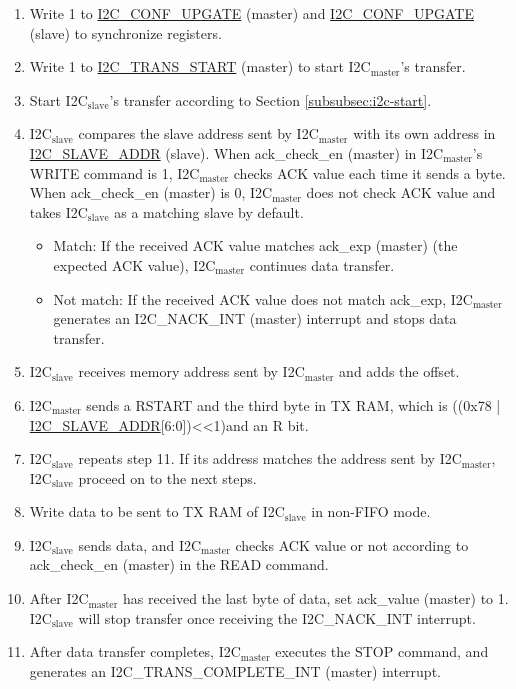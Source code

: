 \documentclass[main\_\_EN.tex]{subfiles}
\begin{document}
\begin{enumerate}
\item Write 1 to \hyperref[fielddesc:I2CCONFUPGATE]{I2C\_CONF\_UPGATE} (master) and \hyperref[fielddesc:I2CCONFUPGATE]{I2C\_CONF\_UPGATE} (slave) to synchronize registers.
\item Write 1 to \hyperref[fielddesc:I2CTRANSSTART]{I2C\_TRANS\_START} (master) to start I2C$_\text{master}$'s transfer.
\item Start I2C$_\text{slave}$'s transfer according to Section \ref{subsubsec:i2c-start}.
\item I2C$_\text{slave}$ compares the slave address sent by I2C$_\text{master}$ with its own address in \hyperref[fielddesc:I2CSLAVEADDR]{I2C\_SLAVE\_ADDR} (slave). When ack\_check\_en (master) in I2C$_\text{master}$'s WRITE command is 1, I2C$_\text{master}$ checks ACK value each time it sends a byte. When ack\_check\_en (master) is 0, I2C$_\text{master}$ does not check ACK value and takes I2C$_\text{slave}$ as a matching slave by default.
\begin{itemize}
\item Match: If the received ACK value matches ack\_exp (master) (the expected ACK value), I2C$_\text{master}$ continues data transfer.
\item Not match: If the received ACK value does not match ack\_exp, I2C$_\text{master}$ generates an I2C\_NACK\_INT (master) interrupt and stops data transfer.
\end{itemize}
\item I2C$_\text{slave}$ receives memory address sent by I2C$_\text{master}$ and adds the offset.
\item I2C$_\text{master}$ sends a RSTART and the third byte in TX RAM, which is ((0x78 | \hyperref[fielddesc:I2CSLAVEADDR]{I2C\_SLAVE\_ADDR}[6:0])<<1)and an R bit.
\item I2C$_\text{slave}$ repeats step 11. If its address matches the address sent by I2C$_\text{master}$, I2C$_\text{slave}$ proceed on to the next steps.
\item Write data to be sent to TX RAM of I2C$_\text{slave}$ in non-FIFO mode.
\item I2C$_\text{slave}$ sends data, and I2C$_\text{master}$ checks ACK value or not according to ack\_check\_en (master) in the READ command.
\item After I2C$_\text{master}$ has received the last byte of data, set ack\_value (master) to 1. I2C$_\text{slave}$ will stop transfer once receiving the I2C\_NACK\_INT interrupt.
\item After data transfer completes, I2C$_\text{master}$ executes the STOP command, and generates an I2C\_TRANS\_COMPLETE\_INT (master) interrupt.
\end{enumerate}
\end{document}
